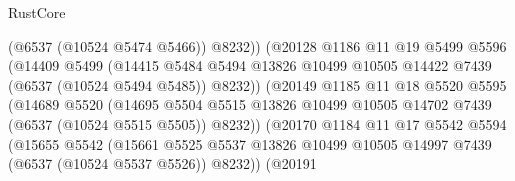 \begin{lexlean}{RustCore}
\begin{coremodule}
                                    (@6537 (@10524 @5474 @5466))
                                    @8232))
                                (@20128
                                  @1186
                                  @11
                                  @19
                                  @5499
                                  @5596
                                  (@14409
                                    @5499
                                    (@14415
                                      @5484
                                      @5494
                                      @13826
                                      @10499
                                      @10505
                                      @14422
                                      @7439
                                      (@6537 (@10524 @5494 @5485))
                                      @8232))
                                  (@20149
                                    @1185
                                    @11
                                    @18
                                    @5520
                                    @5595
                                    (@14689
                                      @5520
                                      (@14695
                                        @5504
                                        @5515
                                        @13826
                                        @10499
                                        @10505
                                        @14702
                                        @7439
                                        (@6537 (@10524 @5515 @5505))
                                        @8232))
                                    (@20170
                                      @1184
                                      @11
                                      @17
                                      @5542
                                      @5594
                                      (@15655
                                        @5542
                                        (@15661
                                          @5525
                                          @5537
                                          @13826
                                          @10499
                                          @10505
                                          @14997
                                          @7439
                                          (@6537 (@10524 @5537 @5526))
                                          @8232))
                                      (@20191

\end{coremodule}
\end{lexlean}
